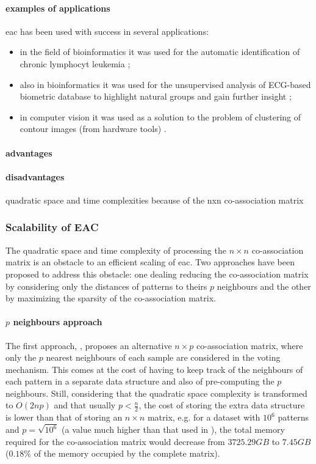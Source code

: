\paragraph{examples of applications}

\gls{eac} has been used with success in several applications:
\begin{itemize}
	\item in the field of bioinformatics it was used for the automatic identification of chronic lymphocyt leukemia \cite{Qian2010};
	\item also in bioinformatics it was used for the unsupervised analysis of ECG-based biometric database to highlight natural groups and gain further insight \cite{Lourenco2009};
	\item in computer vision it was used as a solution to the problem of clustering of contour images (from hardware tools) \cite{Lourenco2007}.
\end{itemize}



\paragraph{advantages}

\paragraph{disadvantages}
quadratic space and time complexities because of the nxn co-association matrix 


\subsubsection{Scalability of EAC} 
The quadratic space and time complexity of processing the $n \times n$ co-association matrix is an obstacle to an efficient scaling of \gls{eac}. Two approaches have been proposed to address this obstacle: one dealing reducing the co-association matrix by considering only the distances of patterns to theirs $p$ neighbours and the other by maximizing the sparsity of the co-association matrix.

\paragraph{$p$ neighbours approach}
The first approach, \cite{Fred2005}, proposes an alternative $n \times p$ co-association matrix, where only the $p$ nearest neighbours of each sample are considered in the voting mechanism. This comes at the cost of having to keep track of the neighbours of each pattern in a separate data structure and also of pre-computing the $p$ neighbours. Still, considering that the quadratic space complexity is transformed to $O(2np)$ and that usually $p < \frac{n}{2}$, the cost of storing the extra data structure is lower than that of storing an $n \times n$ matrix, e.g. for a dataset with $10^6$ patterns and $p=\sqrt{10^6}$ (a value much higher than that used in \cite{Fred2005}), the total memory required for the co-association matrix would decrease from $3725.29 GB$ to $7.45 GB$ ($0.18\%$ of the memory occupied by the complete matrix).

